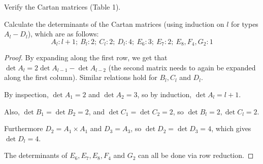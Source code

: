 \begin{ex}
  Verify the Cartan matrices (Table 1).
\end{ex}

\begin{ex}
  Calculate the determinants of the Cartan matrices (using induction on $l$ for types $A_l - D_l$), which are as follows:
  \begin{equation*}
    A_l : l + 1;\ B_l : 2;\ C_l : 2;\ D_l : 4;\ E_6 : 3;\ E_7 : 2;\ E_8, F_4, G_2 : 1
  \end{equation*}
\end{ex}
\begin{proof}
  By expanding along the first row, we get that $\det A_l = 2\det A_{l-1} - \det A_{l-2}$ (the second matrix needs to again be expanded along the first column). Similar relations hold for $B_l, C_l$ and $D_l$.

  By inspection, $\det A_1 = 2$ and $\det A_2=3$, so by induction, $\det A_l = l + 1$.

  Also, $\det B_1 = \det B_2 = 2$, and $\det C_1 = \det C_2 = 2$, so $\det B_l = 2, \det C_l = 2$.

  Furthermore $D_2 = A_1 \times A_1$ and $D_3 = A_3$, so $\det D_2 = \det D_3 = 4$, which gives $\det D_l = 4$.

  The determinants of $E_6, E_7, E_8, F_4$ and $G_2$ can all be done via row reduction.
\end{proof}

